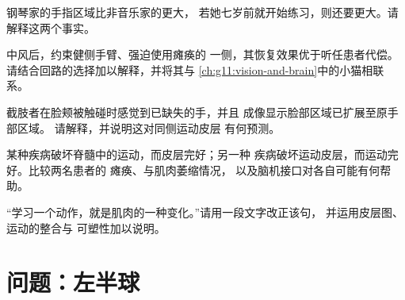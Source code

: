 \begin{exercise}[$\star\star$]\label{exo:g12:brain-and-movement:11}
钢琴家的手指区域比非音乐家的更大，
若她七岁前就开始练习，则还要更大。请解释这两个事实。
\end{exercise}

\begin{exercise}[$\star\star\star$]\label{exo:g12:brain-and-movement:12}
中风后，约束健侧手臂、强迫使用瘫痪的
一侧，其恢复效果优于听任患者代偿。
请结合回路的选择加以解释，并将其与
\cref{ch:g11:vision-and-brain}中的小猫相联系。
\end{exercise}

\begin{exercise}[$\star\star\star$]\label{exo:g12:brain-and-movement:13}
截肢者在脸颊被触碰时感觉到已缺失的手，并且
成像显示脸部区域已扩展至原手部区域。
请解释，并说明这对同侧运动皮层
有何预测。
\end{exercise}

\begin{exercise}[$\star\star\star$]\label{exo:g12:brain-and-movement:14}
某种疾病破坏脊髓中的运动，而皮层完好；另一种
疾病破坏运动皮层，而运动完好。比较两名患者的
瘫痪、与肌肉萎缩情况，
以及脑机接口对各自可能有何帮助。
\end{exercise}

\begin{exercise}[$\star\star\star$]\label{exo:g12:brain-and-movement:15}
“学习一个动作，就是肌肉的一种变化。”请用一段文字改正该句，
并运用皮层图、运动的整合与
可塑性加以说明。
\end{exercise}

\section{问题：左半球}

